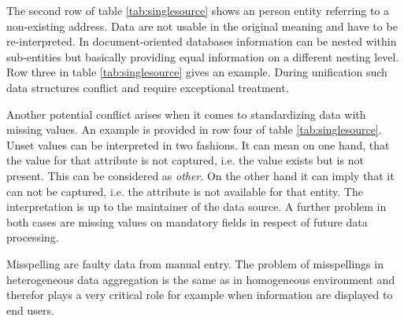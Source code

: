 The second row of table \ref{tab:singlesource} shows an person entity referring to a non-existing address. Data are not usable in the original meaning and have to be re-interpreted. In document-oriented databases information can be nested within sub-entities but basically providing equal information on a different nesting level. Row three in table \ref{tab:singlesource} gives an example. During unification such data structures conflict and require exceptional treatment. 

Another potential conflict arises when it comes to standardizing data with missing values. An example is provided in row four of table \ref{tab:singlesource}. Unset values can be interpreted in two fashions. It can mean on one hand, that the value for that attribute is not captured, i.e. the value exists but is not present. This can be considered as \textit{other}. On the other hand it can imply that it can not be captured, i.e. the attribute is not available for that entity. The interpretation is up to the maintainer of the data source.  A further problem in both cases are missing values on mandatory fields in respect of future data processing.

Misspelling are faulty data from manual entry. The problem of misspellings in heterogeneous data aggregation is the same as in homogeneous environment and therefor plays a very critical role for example when information are displayed to end users.  

\begin{table}[htb]
\centering
{}
\caption{Examples of single source problems}
\label{tab:singlesource}
\end{table}

